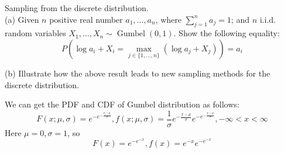 \begin{homeworkProblem}

Sampling from the discrete distribution. \\
(a) Given $n$ positive real number $a_1, \ldots, a_n$, where $\sum\limits_{j=1}^n a_j=1$; and $n$ i.i.d. random variables $X_1, \ldots, X_n \sim \operatorname{Gumbel}(0,1)$. Show the following equality:
$$P\left(\log a_i+X_i=\max _{j \in\{1, \ldots, n\}}\left(\log a_j+X_j\right)\right)=a_i$$

(b) Illustrate how the above result leads to new sampling methods for the discrete distribution.

\solution

We can get the PDF and CDF of Gumbel distribution as follows:
$$F(x;\mu, \sigma) = e^{-e^{-\frac{x-\mu}{\sigma}}}, f(x;\mu,\sigma) = \frac{1}{\sigma}e^{-\frac{x-\mu}{\sigma}}e^{-e^{-\frac{x-\mu}{\sigma}}}, -\infty<x<\infty$$
Here $\mu=0, \sigma=1$, so
$$F(x)=e^{-e^{-x}}, f(x)=e^{-x}e^{-e^{-x}}$$


\end{homeworkProblem}
